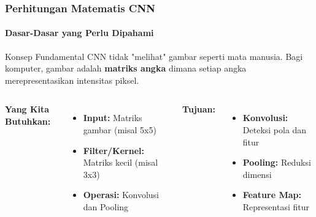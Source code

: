 \documentclass[t,aspectratio=169,xcolor=dvipsnames]{beamer}
\begin{document}
\begin{frame}
    \frametitle{Perhitungan Matematis CNN}
    \framesubtitle{Dasar-Dasar yang Perlu Dipahami}
    \small

    \begin{block}{Konsep Fundamental}
        CNN tidak "melihat" gambar seperti mata manusia. Bagi komputer, gambar adalah \textbf{matriks angka} dimana setiap angka merepresentasikan intensitas piksel.
    \end{block}

    \begin{columns}[t]
        \textbf{Yang Kita Butuhkan:}
        \begin{itemize}
            \item \textbf{Input:} Matriks gambar (misal 5x5)
            \item \textbf{Filter/Kernel:} Matriks kecil (misal 3x3)
            \item \textbf{Operasi:} Konvolusi dan Pooling
        \end{itemize}

        \textbf{Tujuan:}
        \begin{itemize}
            \item \textbf{Konvolusi:} Deteksi pola dan fitur
            \item \textbf{Pooling:} Reduksi dimensi
            \item \textbf{Feature Map:} Representasi fitur
        \end{itemize}
    \end{columns}

\end{frame}
\end{document}
